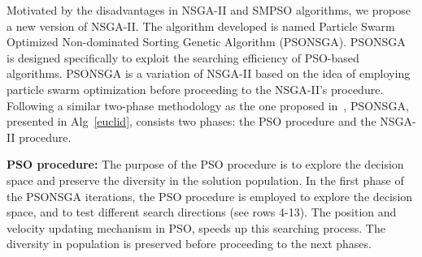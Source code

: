 \documentclass[10pt,journal,compsoc]{IEEEtran}
\begin{document}
Motivated by the disadvantages in NSGA-II and SMPSO algorithms, we propose a new version of NSGA-II. The algorithm developed is named Particle Swarm Optimized Non-dominated Sorting Genetic Algorithm (PSONSGA). PSONSGA is designed specifically to exploit the searching efficiency of PSO-based algorithms. PSONSGA is a variation of NSGA-II based on the idea of employing particle swarm optimization before proceeding to the NSGA-II's procedure. Following a similar two-phase methodology as the one proposed in~\cite{magnier2008multiobjective,onut2008two,sabri2000multi}, PSONSGA, presented in Alg~\ref{euclid}, consists two phases: the PSO procedure and the NSGA-II procedure. %

\noindent\textbf{PSO procedure:}
The purpose of the PSO procedure is to explore the decision space and preserve the diversity in the solution population. In the first phase of the PSONSGA iterations, the PSO procedure is employed to explore the decision space, and to test different search directions (see rows 4-13). The position and velocity updating mechanism in PSO, speeds up this searching process. The diversity in population is preserved before proceeding to the next phases. %
\end{document}
